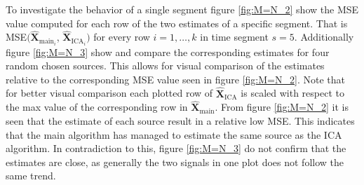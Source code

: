 \noindent
To investigate the behavior of a single segment figure \ref{fig:M=N_2} show the MSE value computed for each row of the two estimates of a specific segment. 
That is MSE$(\hat{\mathbf{X}}_{\text{main}_{i}}$, $\hat{\mathbf{X}}_{\text{ICA}_{i}})$ for every row $i = 1, \dots, k$ in time segment $s = 5$. 
Additionally figure \ref{fig:M=N_3} show and compare the corresponding estimates for four random chosen sources. 
This allows for visual comparison of the estimates relative to the corresponding MSE value seen in figure \ref{fig:M=N_2}. 
Note that for better visual comparison each plotted row of $\hat{\mathbf{X}}_{\text{ICA}}$ is scaled with respect to the max value of the corresponding row in $\hat{\mathbf{X}}_{\text{main}}$.
From figure \ref{fig:M=N_2} it is seen that the estimate of each source result in a relative low MSE. This indicates that the main algorithm has managed to estimate the same source as the ICA algorithm. 
In contradiction to this, figure \ref{fig:M=N_3} do not confirm that the estimates are close, as generally the two signals in one plot does not follow the same trend.   
